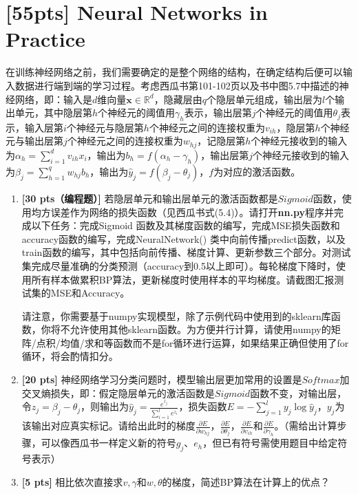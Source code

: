 \documentclass[a4paper,UTF8]{article}
\theoremstyle{definition}
\begin{document}
\newpage


\section{[55pts] Neural Networks in Practice}

\par 在训练神经网络之前，我们需要确定的是整个网络的结构，在确定结构后便可以输入数据进行端到端的学习过程。考虑西瓜书第101-102页以及书中图5.7中描述的神经网络，即：输入是$ d $维向量$ \mathbf{x}\in\mathbb{R}^d $，隐藏层由$ q $个隐层单元组成，输出层为$ l $个输出单元，其中隐层第$ h $个神经元的阈值用$ \gamma_h $表示，输出层第$ j $个神经元的阈值用$ \theta_j $表示，输入层第$ i $个神经元与隐层第$ h $个神经元之间的连接权重为$ v_{ih} $，隐层第$ h $个神经元与输出层第$ j $个神经元之间的连接权重为$ w_{hj} $，记隐层第$ h $个神经元接收到的输入为$ \alpha_h=\sum_{i=1}^{d}v_{ih}x_i $，输出为$ b_h=f(\alpha_h-\gamma_h) $，输出层第$ j $个神经元接收到的输入为$ \beta_j=\sum_{h=1}^{q}w_{hj}b_h $，输出为$ \hat{y}_j=f(\beta_j-\theta_j) $，$ f $为对应的激活函数。

\begin{enumerate}[(1)]
	\item \textbf{[30 pts（编程题）]} 若隐层单元和输出层单元的激活函数都是$Sigmoid$函数，使用均方误差作为网络的损失函数（见西瓜书式(5.4)）。请打开\textbf{nn.py}程序并完成以下任务：完成Sigmoid 函数及其梯度函数的编写，完成MSE损失函数和accuracy函数的编写，完成NeuralNetwork() 类中向前传播predict函数，以及train函数的编写，其中包括向前传播、梯度计算、更新参数三个部分。对测试集完成尽量准确的分类预测（accuracy到0.5以上即可）。每轮梯度下降时，使用所有样本做累积BP算法，更新梯度时使用样本的平均梯度。请截图汇报测试集的MSE和Accuracy。

	      请注意，你需要基于numpy实现模型，除了示例代码中使用到的sklearn库函数，你将不允许使用其他sklearn函数。为方便并行计算，请使用numpy的矩阵/点积/均值/求和等函数而不是for循环进行运算，如果结果正确但使用了for循环，将会酌情扣分。
	\item \textbf{[20 pts]} 神经网络学习分类问题时，模型输出层更加常用的设置是$ Softmax $加交叉熵损失，即：假定隐层单元的激活函数是$Sigmoid$函数不变，对输出层，令$ z_j=\beta_j-\theta_j $，则输出为$ \hat{y}_j=\frac{e^{z_j}}{\sum_{i=1}^{l}e^{z_i}} $，损失函数$ E=-\sum_{j=1}^{l}y_j\log{\hat{y}_j} $，$ y_j $为该输出对应真实标记。请给出此时的梯度$ \frac{\partial{E}}{\partial{w_{hj}}} $，$ \frac{\partial{E}}{\partial{\theta_{j}}} $，$ \frac{\partial{E}}{\partial{v_{ih}}} $和$ \frac{\partial{E}}{\partial{\gamma_{h}}} $。（需给出计算步骤，可以像西瓜书一样定义新的符号$ g_j$、$e_h $，但已有符号需使用题目中给定符号表示）
	\item \textbf{[5 pts]} 相比依次直接求$ v,\gamma $和$ w,\theta $的梯度，简述BP算法在计算上的优点？

\end{enumerate}
\end{document}
